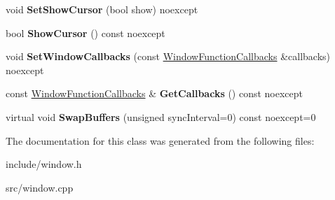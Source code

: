 \begin{DoxyCompactItemize}
void {\bfseries Set\+Show\+Cursor} (bool show) noexcept
\item 
\mbox{\label{class_blade_1_1_window_a99eee4dce8754d7d650fad81ae761d73}} 
bool {\bfseries Show\+Cursor} () const noexcept
\item 
\mbox{\label{class_blade_1_1_window_adc6470559d83f8572790fa32685ed972}} 
void {\bfseries Set\+Window\+Callbacks} (const \hyperlink{struct_blade_1_1_window_function_callbacks}{Window\+Function\+Callbacks} \&callbacks) noexcept
\item 
\mbox{\label{class_blade_1_1_window_a4ad67c9409c02f0d1779b2fc137d62e0}} 
const \hyperlink{struct_blade_1_1_window_function_callbacks}{Window\+Function\+Callbacks} \& {\bfseries Get\+Callbacks} () const noexcept
\item 
\mbox{\label{class_blade_1_1_window_a57f599a1e1ac34de3d535ae27fd6ab7a}} 
virtual void {\bfseries Swap\+Buffers} (unsigned sync\+Interval=0) const noexcept=0
\end{DoxyCompactItemize}


The documentation for this class was generated from the following files\+:\begin{DoxyCompactItemize}
\item 
include/window.\+h\item 
src/window.\+cpp\end{DoxyCompactItemize}
